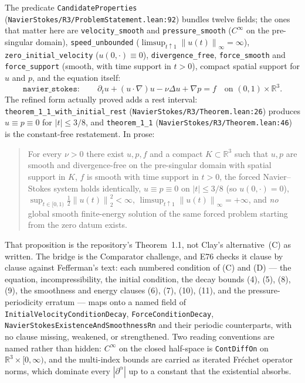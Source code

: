 \documentclass[11pt]{article}
\newcommand{\R}{\mathbb{R}}
\newcommand{\norm}[1]{\left\lVert #1\right\rVert}
\newcommand{\ct}[1]{\texttt{#1}}
\newcommand{\file}[1]{\texttt{\small #1}}
\theoremstyle{plain}
\theoremstyle{definition}
\theoremstyle{remark}
\begin{document}
The predicate \ct{CandidateProperties} (\file{NavierStokes/R3/ProblemStatement.lean:92})
bundles twelve fields; the ones that matter here are
\ct{velocity\_smooth} and \ct{pressure\_smooth} ($C^\infty$ on the pre-singular
domain), \ct{speed\_unbounded} ($\limsup_{t\uparrow 1}\norm{u(t)}_\infty=\infty$),
\ct{zero\_initial\_velocity} ($u(0,\cdot)\equiv0$), \ct{divergence\_free},
\ct{force\_smooth} and \ct{force\_support} (smooth, with time support in
$t>0$), compact spatial support for $u$ and $p$, and the equation itself:
\[
  \ct{navier\_stokes}:\qquad
  \partial_t u+(u\cdot\nabla)u-\nu\Delta u+\nabla p=f
  \quad\text{on }(0,1)\times\R^3 .
\]
The refined form actually proved adds a rest interval:
\ct{theorem\_1\_1\_with\_initial\_rest} (\file{NavierStokes/R3/Theorem.lean:26})
produces $u\equiv p\equiv0$ for $|t|\le 3/8$, and
\ct{theorem\_1\_1} (\file{NavierStokes/R3/Theorem.lean:46}) is the
constant-free restatement. In prose:

\begin{quote}
For every $\nu>0$ there exist $u,p,f$ and a compact $K\subset\R^3$ such that
$u,p$ are smooth and divergence-free on the pre-singular domain with spatial
support in $K$, $f$ is smooth with time support in $t>0$, the forced
Navier--Stokes system holds identically, $u\equiv p\equiv0$ on $|t|\le3/8$ (so
$u(0,\cdot)=0$), $\sup_{t\in[0,1)}\tfrac12\norm{u(t)}_2^2<\infty$,
$\limsup_{t\uparrow1}\norm{u(t)}_\infty=+\infty$, and \emph{no} global smooth
finite-energy solution of the same forced problem starting from the zero datum
exists.
\end{quote}

\medskip
\noindent
That proposition is the repository's Theorem~1.1, not Clay's alternative~(C) as
written. The bridge is the Comparator challenge, and E76 checks it clause by
clause against Fefferman's text: each numbered condition of (C) and (D) --- the
equation, incompressibility, the initial condition, the decay bounds (4), (5),
(8), (9), the smoothness and energy clauses (6), (7), (10), (11), and the
pressure-periodicity erratum --- maps onto a named field of
\ct{InitialVelocityConditionDecay}, \ct{ForceConditionDecay},
\ct{NavierStokesExistenceAndSmoothnessRn} and their periodic counterparts, with
no clause missing, weakened, or strengthened. Two reading conventions are named
rather than hidden: $C^\infty$ on the closed half-space is \ct{ContDiffOn} on
$\R^3\times[0,\infty)$, and the multi-index bounds are carried as iterated
Fr\'echet operator norms, which dominate every $|\partial^\alpha|$ up to a
constant that the existential absorbs.
\end{document}
